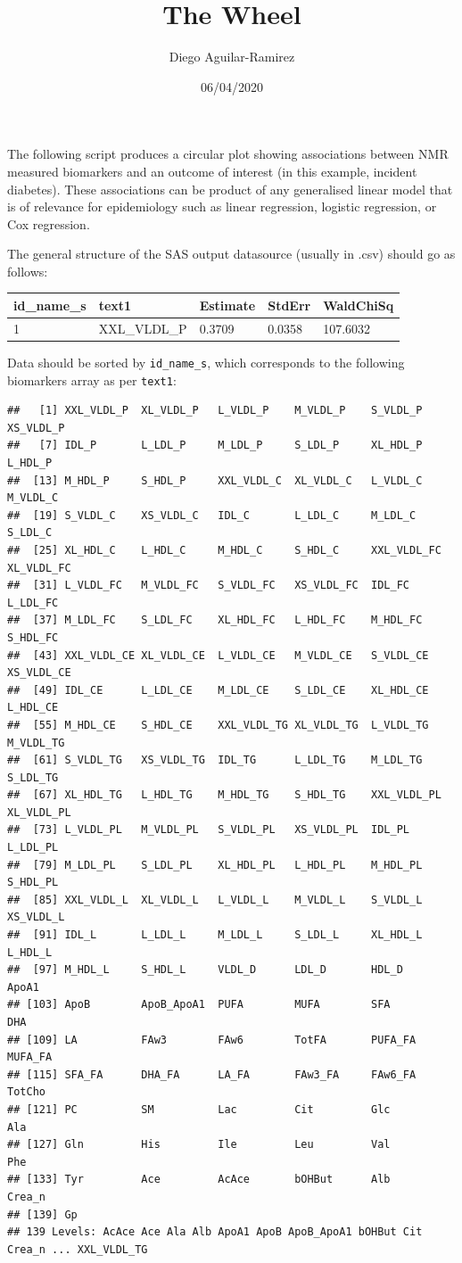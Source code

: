 \documentclass[
]{article}
\title{The Wheel}
\author{Diego Aguilar-Ramirez}
\date{06/04/2020}
\begin{document}
\maketitle

The following script produces a circular plot showing associations
between NMR measured biomarkers and an outcome of interest (in this
example, incident diabetes). These associations can be product of any
generalised linear model that is of relevance for epidemiology such as
linear regression, logistic regression, or Cox regression.

The general structure of the SAS output datasource (usually in .csv)
should go as follows:

\begin{longtable}[]{@{}lllll@{}}
\toprule
id\_name\_s & text1 & Estimate & StdErr & WaldChiSq\tabularnewline
\midrule
\endhead
1 & XXL\_VLDL\_P & 0.3709 & 0.0358 & 107.6032\tabularnewline
\bottomrule
\end{longtable}

Data should be sorted by \texttt{id\_name\_s}, which corresponds to the
following biomarkers array as per \texttt{text1}:

\begin{verbatim}
##   [1] XXL_VLDL_P  XL_VLDL_P   L_VLDL_P    M_VLDL_P    S_VLDL_P    XS_VLDL_P  
##   [7] IDL_P       L_LDL_P     M_LDL_P     S_LDL_P     XL_HDL_P    L_HDL_P    
##  [13] M_HDL_P     S_HDL_P     XXL_VLDL_C  XL_VLDL_C   L_VLDL_C    M_VLDL_C   
##  [19] S_VLDL_C    XS_VLDL_C   IDL_C       L_LDL_C     M_LDL_C     S_LDL_C    
##  [25] XL_HDL_C    L_HDL_C     M_HDL_C     S_HDL_C     XXL_VLDL_FC XL_VLDL_FC 
##  [31] L_VLDL_FC   M_VLDL_FC   S_VLDL_FC   XS_VLDL_FC  IDL_FC      L_LDL_FC   
##  [37] M_LDL_FC    S_LDL_FC    XL_HDL_FC   L_HDL_FC    M_HDL_FC    S_HDL_FC   
##  [43] XXL_VLDL_CE XL_VLDL_CE  L_VLDL_CE   M_VLDL_CE   S_VLDL_CE   XS_VLDL_CE 
##  [49] IDL_CE      L_LDL_CE    M_LDL_CE    S_LDL_CE    XL_HDL_CE   L_HDL_CE   
##  [55] M_HDL_CE    S_HDL_CE    XXL_VLDL_TG XL_VLDL_TG  L_VLDL_TG   M_VLDL_TG  
##  [61] S_VLDL_TG   XS_VLDL_TG  IDL_TG      L_LDL_TG    M_LDL_TG    S_LDL_TG   
##  [67] XL_HDL_TG   L_HDL_TG    M_HDL_TG    S_HDL_TG    XXL_VLDL_PL XL_VLDL_PL 
##  [73] L_VLDL_PL   M_VLDL_PL   S_VLDL_PL   XS_VLDL_PL  IDL_PL      L_LDL_PL   
##  [79] M_LDL_PL    S_LDL_PL    XL_HDL_PL   L_HDL_PL    M_HDL_PL    S_HDL_PL   
##  [85] XXL_VLDL_L  XL_VLDL_L   L_VLDL_L    M_VLDL_L    S_VLDL_L    XS_VLDL_L  
##  [91] IDL_L       L_LDL_L     M_LDL_L     S_LDL_L     XL_HDL_L    L_HDL_L    
##  [97] M_HDL_L     S_HDL_L     VLDL_D      LDL_D       HDL_D       ApoA1      
## [103] ApoB        ApoB_ApoA1  PUFA        MUFA        SFA         DHA        
## [109] LA          FAw3        FAw6        TotFA       PUFA_FA     MUFA_FA    
## [115] SFA_FA      DHA_FA      LA_FA       FAw3_FA     FAw6_FA     TotCho     
## [121] PC          SM          Lac         Cit         Glc         Ala        
## [127] Gln         His         Ile         Leu         Val         Phe        
## [133] Tyr         Ace         AcAce       bOHBut      Alb         Crea_n     
## [139] Gp         
## 139 Levels: AcAce Ace Ala Alb ApoA1 ApoB ApoB_ApoA1 bOHBut Cit Crea_n ... XXL_VLDL_TG
\end{verbatim}
\end{document}
